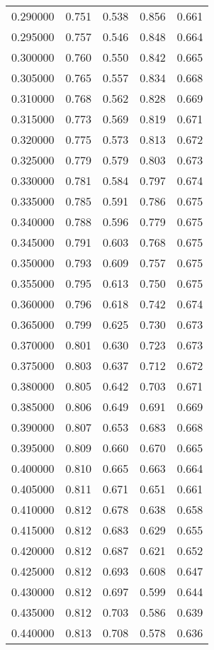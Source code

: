 \begin{table}[htbp]
\begin{tabular}{lllll}
0.290000 & 0.751 & 0.538 & 0.856 & 0.661 \\
0.295000 & 0.757 & 0.546 & 0.848 & 0.664 \\
0.300000 & 0.760 & 0.550 & 0.842 & 0.665 \\
0.305000 & 0.765 & 0.557 & 0.834 & 0.668 \\
0.310000 & 0.768 & 0.562 & 0.828 & 0.669 \\
0.315000 & 0.773 & 0.569 & 0.819 & 0.671 \\
0.320000 & 0.775 & 0.573 & 0.813 & 0.672 \\
0.325000 & 0.779 & 0.579 & 0.803 & 0.673 \\
0.330000 & 0.781 & 0.584 & 0.797 & 0.674 \\
0.335000 & 0.785 & 0.591 & 0.786 & 0.675 \\
0.340000 & 0.788 & 0.596 & 0.779 & 0.675 \\
0.345000 & 0.791 & 0.603 & 0.768 & 0.675 \\
0.350000 & 0.793 & 0.609 & 0.757 & 0.675 \\
0.355000 & 0.795 & 0.613 & 0.750 & 0.675 \\
0.360000 & 0.796 & 0.618 & 0.742 & 0.674 \\
0.365000 & 0.799 & 0.625 & 0.730 & 0.673 \\
0.370000 & 0.801 & 0.630 & 0.723 & 0.673 \\
0.375000 & 0.803 & 0.637 & 0.712 & 0.672 \\
0.380000 & 0.805 & 0.642 & 0.703 & 0.671 \\
0.385000 & 0.806 & 0.649 & 0.691 & 0.669 \\
0.390000 & 0.807 & 0.653 & 0.683 & 0.668 \\
0.395000 & 0.809 & 0.660 & 0.670 & 0.665 \\
0.400000 & 0.810 & 0.665 & 0.663 & 0.664 \\
0.405000 & 0.811 & 0.671 & 0.651 & 0.661 \\
0.410000 & 0.812 & 0.678 & 0.638 & 0.658 \\
0.415000 & 0.812 & 0.683 & 0.629 & 0.655 \\
0.420000 & 0.812 & 0.687 & 0.621 & 0.652 \\
0.425000 & 0.812 & 0.693 & 0.608 & 0.647 \\
0.430000 & 0.812 & 0.697 & 0.599 & 0.644 \\
0.435000 & 0.812 & 0.703 & 0.586 & 0.639 \\
0.440000 & 0.813 & 0.708 & 0.578 & 0.636 \\

\end{tabular}
\end{table}
